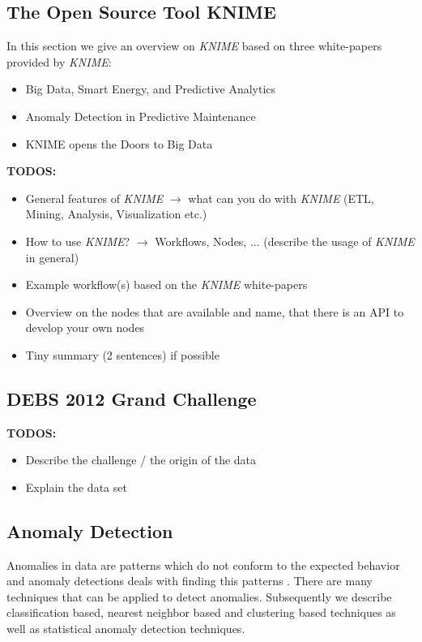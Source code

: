 \documentclass{dima}
\begin{document}
\subsection{The Open Source Tool KNIME}
In this section we give an overview on \textit{KNIME} based on three white-papers provided by \textit{KNIME}:
\begin{itemize}
\item Big Data, Smart Energy, and Predictive Analytics
\item Anomaly Detection in Predictive Maintenance
\item KNIME opens the Doors to Big Data
\end{itemize}

\textbf{TODOS:}
\begin{itemize}
\item General features of \textit{KNIME} $\rightarrow$ what can you do with \textit{KNIME} (ETL, Mining, Analysis, Visualization etc.)
\item How to use \textit{KNIME}? $\rightarrow$ Workflows, Nodes, ... (describe the usage of \textit{KNIME} in general)
\item Example workflow(s) based on the \textit{KNIME} white-papers
\item Overview on the nodes that are available and name, that there is an API to develop your own nodes
\item Tiny summary (2 sentences) if possible
\end{itemize}

\subsection{DEBS 2012 Grand Challenge}
\label{sec:D2012GC}

\textbf{TODOS:}
\begin{itemize}
\item Describe the challenge / the origin of the data
\item Explain the data set
\end{itemize}

\subsection{Anomaly Detection}
Anomalies in data are patterns which do not conform to the expected behavior and anomaly detections deals with finding this patterns \cite{Chandola:2009:ADS:1541880.1541882}. There are many techniques that can be applied to detect anomalies. Subsequently we describe classification based, nearest neighbor based and clustering based techniques as well as statistical anomaly detection techniques.
\end{document}
